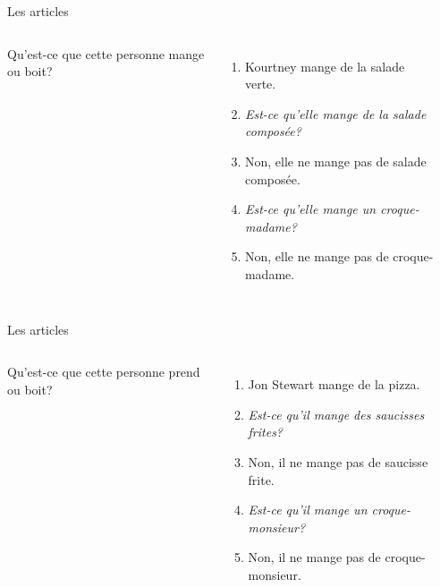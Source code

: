 \documentclass{beamer}
\begin{document}
  \begin{frame}{Les articles}
    \begin{columns}
        Qu'est-ce que cette personne mange ou boit?
        \begin{enumerate}
          \item<2-> Kourtney mange de la salade verte.
          \item<2-> \emph{Est-ce qu'elle mange de la salade composée?}
          \item<3-> Non, elle ne mange pas de salade composée.
          \item<3-> \emph{Est-ce qu'elle mange un croque-madame?}
          \item<4-> Non, elle ne mange pas de croque-madame.
        \end{enumerate}
        \begin{minipage}[c][0.6\textwidth]{\linewidth}
          \begin{center}
          \end{center}
        \end{minipage}
    \end{columns}
  \end{frame}

  \begin{frame}{Les articles}
    \begin{columns}
        Qu'est-ce que cette personne prend ou boit?
        \begin{enumerate}
          \item<2-> Jon Stewart mange de la pizza.
          \item<2-> \emph{Est-ce qu'il mange des saucisses frites?}
          \item<3-> Non, il ne mange pas de saucisse frite.
          \item<3-> \emph{Est-ce qu'il mange un croque-monsieur?}
          \item<4-> Non, il ne mange pas de croque-monsieur.
        \end{enumerate}
        \begin{minipage}[c][0.6\textwidth]{\linewidth}
          \begin{center}
          \end{center}
        \end{minipage}
    \end{columns}
  \end{frame}
\end{document}
